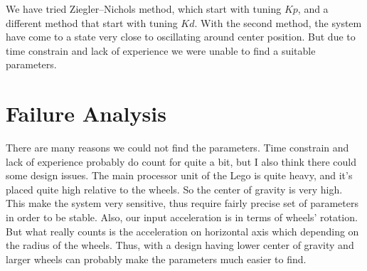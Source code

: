 \documentclass{notes}
\begin{document}
We have tried Ziegler–Nichols method, which start with tuning $Kp$, and a different method that
start with tuning $Kd$. With the second method, the system have come to a state very close to
oscillating around center position. But due to time constrain and lack of experience we were unable
to find a suitable parameters.

\section{Failure Analysis}

There are many reasons we could not find the parameters. Time constrain and lack of experience
probably do count for quite a bit, but I also think there could some design issues. The main
processor unit of the Lego is quite heavy, and it's placed quite high relative to the wheels. So the
center of gravity is very high. This make the system very sensitive, thus require fairly precise set
of parameters in order to be stable. Also, our input acceleration is in terms of wheels' rotation.
But what really counts is the acceleration on horizontal axis which depending on the radius of the
wheels. Thus, with a design having lower center of gravity and larger wheels can probably make the
parameters much easier to find.

\end{document}
